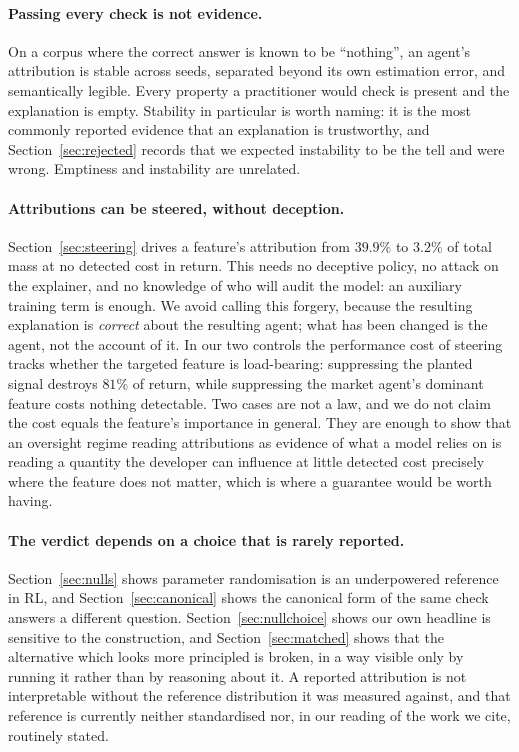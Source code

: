 \documentclass[10pt,twocolumn]{article}
\begin{document}
\paragraph{Passing every check is not evidence.}
On a corpus where the correct answer is known to be ``nothing'', an agent's
attribution is stable across seeds, separated beyond its own estimation error,
and semantically legible. Every property a practitioner would check is present
and the explanation is empty. Stability in particular is worth naming: it is
the most commonly reported evidence that an explanation is trustworthy, and
Section~\ref{sec:rejected} records that we expected instability to be the tell
and were wrong. Emptiness and instability are unrelated.

\paragraph{Attributions can be steered, without deception.}
Section~\ref{sec:steering} drives a feature's attribution from $39.9\%$ to
$3.2\%$ of total mass at no detected cost in return. This needs no deceptive
policy, no attack on the explainer, and no knowledge of who will audit the
model: an auxiliary training term is enough. We avoid calling this forgery,
because the resulting explanation is \emph{correct} about the resulting agent;
what has been changed is the agent, not the account of it. In our two controls
the performance cost of steering tracks whether the targeted feature is
load-bearing: suppressing the planted signal destroys $81\%$ of return, while
suppressing the market agent's dominant feature costs nothing detectable. Two
cases are not a law, and we do not claim the cost equals the feature's
importance in general. They are enough to show that an oversight regime reading
attributions as evidence of what a model relies on is reading a quantity the
developer can influence at little detected cost precisely where the feature
does not matter, which is where a guarantee would be worth having.

\paragraph{The verdict depends on a choice that is rarely reported.}
Section~\ref{sec:nulls} shows parameter randomisation is an underpowered
reference in RL, and Section~\ref{sec:canonical} shows the canonical form of the
same check answers a different question. Section~\ref{sec:nullchoice} shows our own headline is sensitive to the
construction, and Section~\ref{sec:matched} shows that the alternative which
looks more principled is broken, in a way visible only by running it rather than
by reasoning about it. A reported attribution is not interpretable without the
reference distribution it was measured against, and that reference is currently
neither standardised nor, in our reading of the work we cite, routinely
stated.
\end{document}
